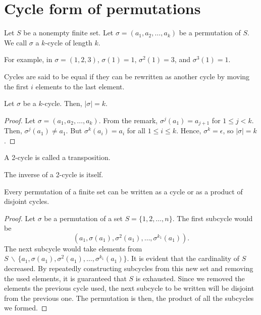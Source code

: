 \section{Cycle form of permutations}
    \renewcommand{\leftmark}{April 15, 2024}

    \begin{dfn}
        Let \(S\) be a nonempty finite set. Let \(\sigma = (a_1, a_2, \ldots, a_k)\) be a permutation of \(S\). We call \(\sigma\) a \(k\)-cycle of length \(k\).
    \end{dfn}

    For example, in \(\sigma = (1, 2, 3)\), \(\sigma(1) = 1\), \(\sigma^2(1) = 3\), and \(\sigma^3(1) = 1\).

    \begin{note}
        Cycles are said to be equal if they can be rewritten as another cycle by moving the first \(i\) elements to the last element.
    \end{note}

    \begin{thm}
        Let \(\sigma\) be a \(k\)-cycle. Then, \(|\sigma| = k\).
    \end{thm}

    \begin{proof}
        Let \(\sigma = (a_1, a_2, \ldots, a_k)\). From the remark, \(\sigma^j(a_1) = a_{j + 1}\) for \(1 \leq j < k\). Then, \(\sigma^j(a_1) \neq a_1\). But \(\sigma^k (a_i) = a_i\) for all \(1 \leq i \leq k\). Hence, \(\sigma^k = \epsilon\), so \(|\sigma| = k\).
    \end{proof}

    \begin{dfn}
        A 2-cycle is called a transposition.
    \end{dfn}

    \begin{thm}
        The inverse of a 2-cycle is itself.
    \end{thm}

    \begin{thm}
        Every permutation of a finite set can be written as a cycle or as a product of disjoint cycles.
    \end{thm}
 
    \begin{proof}
        Let \(\sigma\) be a permutation of a set \(S = \{1, 2, \ldots, n\}\). The first subcycle would be \[(a_1, \sigma(a_1), \sigma^2(a_1), \ldots, \sigma^{k_1}(a_1)).\] The next subcycle would take elements from \(S\, \backslash\, \{a_1, \sigma(a_1), \sigma^2(a_1), \ldots, \sigma^{k_1}(a_1)\}\). It is evident that the cardinality of \(S\) decreased. By repeatedly constructing subcycles from this new set and removing the used elements, it is guaranteed that \(S\) is exhausted. Since we removed the elements the previous cycle used, the next subcycle to be written will be disjoint from the previous one. The permutation is then, the product of all the subcycles we formed.
    \end{proof}

